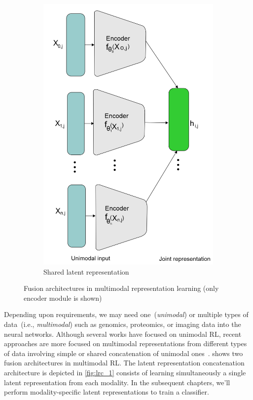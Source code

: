 \begin{figure}[htp!]
\begin{subfigure}{0.48\linewidth}
		\centering
		\includegraphics[scale=0.4]{images/shared.png}
		\caption{Shared latent representation}
        \label{fig:slr_1}
	\end{subfigure}
	\caption[Fusion architectures in multimodal representation learning]{Fusion architectures in multimodal representation learning (only encoder module is shown)} 
	\label{fig:mm_rL_example}
\end{figure}

\hspace*{3.5mm} Depending upon requirements, we may need one~(\textit{unimodal}) or multiple types of data~(i.e., \textit{multimodal}) such as genomics, proteomics, or imaging data into the neural networks. Although several works have focused on unimodal RL, recent approaches are more focused on multimodal representations from different types of data involving simple or shared concatenation of unimodal ones~\cite{mmsurvey}.  shows two fusion architectures in multimodal RL. The latent representation concatenation architecture is depicted in \cref{fig:lrc_1} consists of learning simultaneously a single latent representation from each modality. In the subsequent chapters, we'll perform modality-specific latent representations to train a classifier. 

